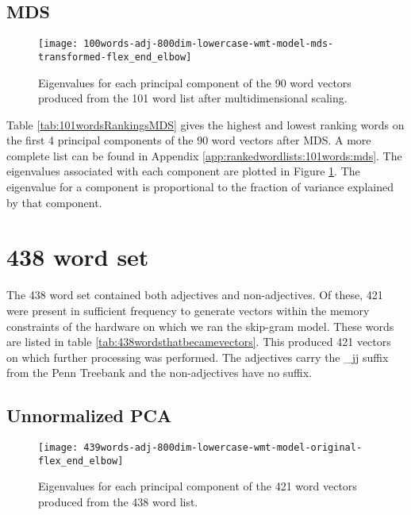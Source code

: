 \documentclass[eric_thesis.tex]{subfiles}
\begin{document}
\subsection{MDS}



\begin{figure}[!tbp]
    \texttt{[image: 100words-adj-800dim-lowercase-wmt-model-mds-transformed-flex\_end\_elbow]}
    \caption{Eigenvalues for each principal component of the 90 word vectors
    produced from the 101 word list after multidimensional scaling.}
    \label{fig:101wordsmdseigenvalues}
\end{figure}

Table \ref{tab:101wordsRankingsMDS} gives the highest and lowest
ranking words on the first 4 principal components of the 90 word 
vectors after MDS. A more complete list can be found in Appendix 
\ref{app:rankedwordlists:101words:mds}. The eigenvalues associated 
with each component are plotted in Figure 
\ref{fig:101wordsmdseigenvalues}. The eigenvalue for a component is
proportional to the fraction of variance explained by that component.


\section{438 word set}

The 438 word set contained both adjectives and non-adjectives. Of these, 421 
were present in sufficient frequency to generate vectors within the memory 
constraints of the hardware on which we ran the skip-gram model. These words are 
listed in table \ref{tab:438wordsthatbecamevectors}. This produced 421 vectors 
on which further processing was performed. The adjectives carry the \_jj suffix 
from the Penn Treebank  and the non-adjectives have 
no suffix.




\subsection{Unnormalized PCA}



\begin{figure}[!tbp]
    \texttt{[image: 439words-adj-800dim-lowercase-wmt-model-original-flex\_end\_elbow]}
    \caption{Eigenvalues for each principal component of the 421 word vectors
    produced from the 438 word list.}
    \label{fig:438wordsunnormalizedpcaeigenvalues}
\end{figure}
\end{document}
